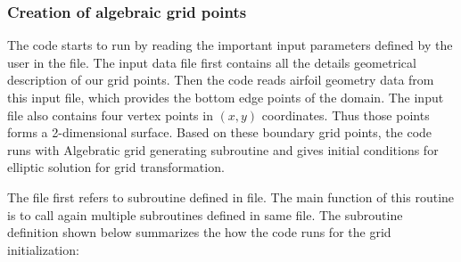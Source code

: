 \documentclass[letterpaper,10pt,english]{sphinxmanual}
\begin{document}
\subsubsection{Creation of algebraic grid points}
\label{\detokenize{devel:creation-of-algebraic-grid-points}}
The code starts to run by reading the important input parameters defined by the user in the  file. The input data file first contains all the details geometrical description of our grid points. Then the code reads airfoil geometry data from this input file, which provides the bottom edge points of the domain. The input file also contains four vertex points in \((x,y)\) coordinates. Thus those points forms a 2-dimensional surface. Based on these boundary grid points, the code runs with Algebratic grid generating subroutine and gives initial conditions for elliptic solution for grid transformation.

The  file first refers to  subroutine defined in  file. The main function of this routine is to call again multiple subroutines defined in same file. The subroutine definition shown below summarizes the how the code runs for the grid initialization:
\end{document}
